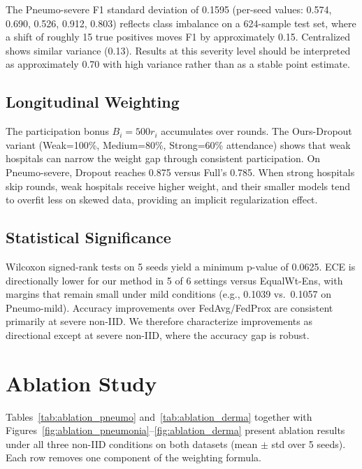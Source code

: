 \documentclass[conference]{IEEEtran}
\begin{document}
The Pneumo-severe F1 standard deviation of 0.1595 (per-seed values: 0.574, 0.690, 0.526, 0.912, 0.803) reflects class imbalance on a 624-sample test set, where a shift of roughly 15 true positives moves F1 by approximately 0.15. Centralized shows similar variance (0.13). Results at this severity level should be interpreted as approximately 0.70 with high variance rather than as a stable point estimate.

\subsection{Longitudinal Weighting}

The participation bonus $B_i = 500r_i$ accumulates over rounds. The Ours-Dropout variant (Weak=100\%, Medium=80\%, Strong=60\% attendance) shows that weak hospitals can narrow the weight gap through consistent participation. On Pneumo-severe, Dropout reaches 0.875 versus Full's 0.785. When strong hospitals skip rounds, weak hospitals receive higher weight, and their smaller models tend to overfit less on skewed data, providing an implicit regularization effect.

\subsection{Statistical Significance}

Wilcoxon signed-rank tests on 5 seeds yield a minimum p-value of 0.0625. ECE is directionally lower for our method in 5 of 6 settings versus EqualWt-Ens, with margins that remain small under mild conditions (e.g., 0.1039 vs.\ 0.1057 on Pneumo-mild). Accuracy improvements over FedAvg/FedProx are consistent primarily at severe non-IID. We therefore characterize improvements as directional except at severe non-IID, where the accuracy gap is robust.

\section{Ablation Study}

Tables~\ref{tab:ablation_pneumo} and~\ref{tab:ablation_derma} together with Figures~\ref{fig:ablation_pneumonia}--\ref{fig:ablation_derma} present ablation results under all three non-IID conditions on both datasets (mean $\pm$ std over 5 seeds). Each row removes one component of the weighting formula.
\end{document}
